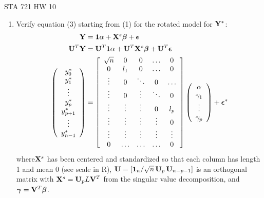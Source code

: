 \documentclass{article}
\begin{document}
\begin{center}
  STA 721 HW 10
\end{center}

\begin{enumerate}
\item Verify  equation (3) starting from  (1) for the
  rotated model for $\mathbf{Y}^*$: 
  \begin{align}
    \mathbf{Y} & = \mathbf{1} \alpha + \mathbf{X}^s \boldsymbol{\beta} + \boldsymbol{\epsilon} \\
    \mathbf{U}^T\mathbf{Y} & = \mathbf{U}^T\mathbf{1} \alpha + \mathbf{U}^T \mathbf{X}^s \boldsymbol{\beta} + \mathbf{U}^T\boldsymbol{\epsilon} \\
\left(
    \begin{array}{c}
      y_0^* \\
      y_1^* \\
    \vdots \\
      y_p^* \\
      y_{p+1}^* \\
      \vdots \\
      y_{n-1}^*
    \end{array} \right)
 & =  
\left[
 \begin{array}{ccccc}
      \sqrt{n} & 0 & 0  & \ldots & 0\\
      0 & l_1 & 0 & \ldots & 0 \\
    \vdots & 0 & \ddots &  0 & \ldots \\
    \vdots&  0 & \vdots & \ddots & 0 \\
    \vdots&  \vdots & \vdots & 0 & l_p \\
    \vdots & \vdots & \vdots &\vdots &  0 \\
    \vdots & \vdots & \vdots &\vdots &  \vdots \\
     0 & \ldots & \ldots & \ldots & 0  
    \end{array} \right]
\left(
                                    \begin{array}{c}
                                      \alpha \\
                                      \gamma_1 \\
                                      \vdots \\
                                      \gamma_p
                                    \end{array}
\right)
+ \boldsymbol{\epsilon}^*
  \end{align} 
where$\mathbf{X}^s$ has been centered and standardized so that each column has
length 1 and mean 0 (see scale in R), $\mathbf{U} = [\mathbf{1}_n/\sqrt{n} \, \mathbf{U}_p \,
\mathbf{U}_{n-p-1}]$ is an orthogonal matrix with $\mathbf{X}^s = \mathbf{U}_p L \mathbf{V}^T$ from
the singular value decomposition, and $\boldsymbol{\gamma} = \mathbf{V}^T\boldsymbol{\beta}$.


\end{enumerate}
\end{document}
